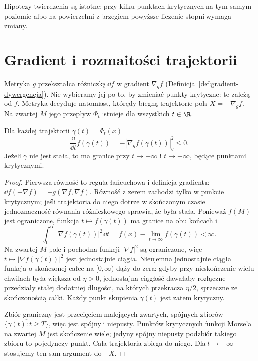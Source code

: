 Hipotezy twierdzenia są istotne: przy kilku punktach
krytycznych na tym samym poziomie albo na powierzchni
z brzegiem powyższe liczenie stopni wymaga zmiany.

\section{Gradient i rozmaitości trajektorii}
\label{sec:gradient-morse-17}

Metryka $g$ przekształca różniczkę
$\dd f$ w gradient $\nabla_g f$
(Definicja~\ref{def:gradient-dywergencja}).
Nie wybieramy jej po to, by zmieniać
punkty krytyczne: te zależą od $f$.
Metryka decyduje natomiast, którędy
biegną trajektorie pola
$X=-\nabla_g f$.
Na zwartej $M$ jego przepływ
$\Phi_t$ istnieje dla wszystkich
$t\in\R$.

\begin{stwierdzenie}
\label{prop:spadek-morse-17}
Dla każdej trajektorii $\gamma(t)=\Phi_t(x)$
\begin{equation}\label{eq:spadek-morse-17}
 \frac{\dd}{\dd t} f(\gamma(t))
 =-|\nabla_g f(\gamma(t))|_g^2\leq0.
\end{equation}
Jeżeli $\gamma$ nie jest stała, to
ma granice przy $t\to-\infty$
i $t\to+\infty$, będące
punktami krytycznymi.
\end{stwierdzenie}
\begin{proof}
Pierwsza równość to reguła łańcuchowa
i definicja gradientu:
$\dd f(-\nabla f)=-g(\nabla f,\nabla f)$.
Równość z zerem zachodzi tylko w punkcie
krytycznym; jeśli trajektoria
do niego dotrze w skończonym czasie,
jednoznaczność równania różniczkowego
sprawia, że była stała.
Ponieważ $f(M)$ jest ograniczone,
funkcja $t\mapsto f(\gamma(t))$
ma granice na obu końcach i
\[
 \int_0^\infty
       |\nabla f(\gamma(t))|^2\,\dd t
 =f(x)-\lim_{t\to\infty}f(\gamma(t))
 <\infty.
\]
Na zwartej $M$ pole i pochodna
funkcji $|\nabla f|^2$ są ograniczone,
więc $t\mapsto|\nabla f(\gamma(t))|^2$
jest jednostajnie ciągła.
Nieujemna jednostajnie ciągła
funkcja o skończonej całce na
$[0,\infty)$ dąży do zera:
gdyby przy nieskończenie wielu
chwilach była większa od $\eta>0$,
jednostajna ciągłość dawałaby
rozłączne przedziały stałej
dodatniej długości, na których
przekracza $\eta/2$, sprzeczne
ze skończonością całki.
Każdy punkt skupienia $\gamma(t)$
jest zatem krytyczny.

Zbiór graniczny jest przecięciem
malejących zwartych, spójnych
zbiorów
$\overline{\{\gamma(t):t\geq T\}}$,
więc jest spójny i niepusty.
Punktów krytycznych funkcji
Morse'a na zwartej $M$ jest
skończenie wiele; jedyny
spójny niepusty podzbiór
takiego zbioru to pojedynczy
punkt. Cała trajektoria
zbiega do niego. Dla
$t\to-\infty$ stosujemy
ten sam argument do $-X$.
\end{proof}

